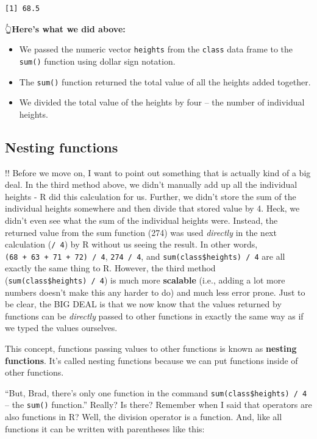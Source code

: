 \documentclass[
  letterpaper,
  DIV=11,
  numbers=noendperiod]{scrreprt}
\begin{document}
\begin{verbatim}
[1] 68.5
\end{verbatim}

👆\textbf{Here's what we did above:}

\begin{itemize}
\item
  We passed the numeric vector \texttt{heights} from the \texttt{class}
  data frame to the \texttt{sum()} function using dollar sign notation.
\item
  The \texttt{sum()} function returned the total value of all the
  heights added together.
\item
  We divided the total value of the heights by four -- the number of
  individual heights.
\end{itemize}

\subsection{Nesting functions}\label{nesting-functions}

{!!} Before we move on, I want to point out something that is actually
kind of a big deal. In the third method above, we didn't manually add up
all the individual heights - R did this calculation for us. Further, we
didn't store the sum of the individual heights somewhere and then divide
that stored value by 4. Heck, we didn't even see what the sum of the
individual heights were. Instead, the returned value from the sum
function (274) was used \emph{directly} in the next calculation
(\texttt{/\ 4}) by R without us seeing the result. In other words,
\texttt{(68\ +\ 63\ +\ 71\ +\ 72)\ /\ 4}, \texttt{274\ /\ 4}, and
\texttt{sum(class\$heights)\ /\ 4} are all exactly the same thing to R.
However, the third method (\texttt{sum(class\$heights)\ /\ 4}) is much
more \textbf{scalable} (i.e., adding a lot more numbers doesn't make
this any harder to do) and much less error prone. Just to be clear, the
BIG DEAL is that we now know that the values returned by functions can
be \emph{directly} passed to other functions in exactly the same way as
if we typed the values ourselves.

This concept, functions passing values to other functions is known as
\textbf{nesting functions}. It's called nesting functions because we can
put functions inside of other functions.

``But, Brad, there's only one function in the command
\texttt{sum(class\$heights)\ /\ 4} -- the \texttt{sum()} function.''
Really? Is there? Remember when I said that operators are also functions
in R? Well, the division operator is a function. And, like all functions
it can be written with parentheses like this:
\end{document}
